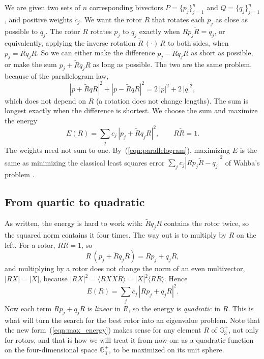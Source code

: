 \documentclass{birkjour}
\theoremstyle{definition}
\theoremstyle{remark}
\numberwithin{equation}{section}
\newcommand{\rev}[1]{\widetilde{#1}}
\newcommand{\scal}[1]{\langle #1 \rangle}
\newcommand{\Ge}{\mathbb{G}}
\begin{document}
We are given two sets of $n$ corresponding bivectors $P = \{p_j\}_{j=1}^n$ and $Q = \{q_j\}_{j=1}^n$, and positive weights $c_j$. We want the rotor $R$ that rotates each $p_j$ as close as possible to $q_j$. The rotor $R$ rotates $p_j$ to $q_j$ exactly when $R p_j \rev{R} = q_j$, or equivalently, applying the inverse rotation $\rev{R}\, (\cdot)\, R$ to both sides, when $p_j = \rev{R} q_j R$. So we can either make the difference $p_j - \rev{R} q_j R$ as short as possible, or make the sum $p_j + \rev{R} q_j R$ as long as possible. The two are the same problem, because of the parallelogram law,
\begin{equation}
\label{eqn:parallelogram}
|p + \rev{R} q R|^2 + |p - \rev{R} q R|^2 = 2\, |p|^2 + 2\, |q|^2,
\end{equation}
which does not depend on $R$ (a rotation does not change lengths). The sum is longest exactly when the difference is shortest. We choose the sum and maximize the energy
\begin{equation}
\label{eqn:energy}
E(R) = \sum_j c_j\, |p_j + \rev{R} q_j R|^2, \qquad R \rev{R} = 1.
\end{equation}
The weights need not sum to one. By~(\ref{eqn:parallelogram}), maximizing $E$ is the same as minimizing the classical least squares error $\sum_j c_j |R p_j \rev{R} - q_j|^2$ of Wahba's problem \cite{Wahba1965}.

\subsection{From quartic to quadratic}

As written, the energy is hard to work with: $\rev{R} q_j R$ contains the rotor twice, so the squared norm contains it four times. The way out is to multiply by $R$ on the left. For a rotor, $R \rev{R} = 1$, so
\begin{equation}
R\, (p_j + \rev{R} q_j R) = R p_j + q_j R,
\end{equation}
and multiplying by a rotor does not change the norm of an even multivector, $|R X| = |X|$, because $|R X|^2 = \scal{R X \rev{X} \rev{R}} = |X|^2 \scal{R \rev{R}}$. Hence
\begin{equation}
\label{eqn:max_energy}
E(R) = \sum_j c_j\, |R p_j + q_j R|^2.
\end{equation}
Now each term $R p_j + q_j R$ is \emph{linear} in $R$, so the energy is \emph{quadratic} in $R$. This is what will turn the search for the best rotor into an eigenvalue problem. Note that the new form~(\ref{eqn:max_energy}) makes sense for any element $R$ of $\Ge_3^+$, not only for rotors, and that is how we will treat it from now on: as a quadratic function on the four-dimensional space $\Ge_3^+$, to be maximized on its unit sphere.
\end{document}
